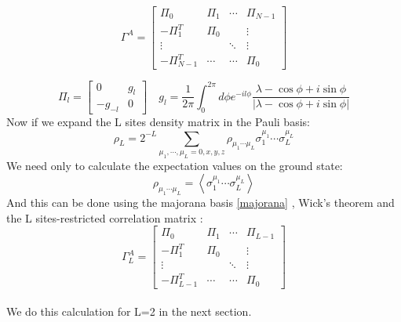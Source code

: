 \documentclass[10pt,a4paper]{article}
\begin{document}
	\begin{equation}\label{eq:corrmatr2}
	\Gamma^{A}=\left[\begin{array}{cccc}
	\Pi_{0} & \Pi_{1} & \cdots & \Pi_{N-1} \\
	-\Pi_{1}^T & \Pi_{0} & & \vdots \\
	\vdots & & \ddots & \vdots \\
	-\Pi_{N-1}^T & \cdots & \cdots & \Pi_{0}
	\end{array}\right]\end{equation}

	\begin{equation}\label{eq:corrmatr3}
	\Pi_{l}=\left[\begin{array}{cc}
	0 & g_{l} \\
	-g_{-l} & 0
	\end{array}\right] 
	 \quad g_{l}=\frac{1}{2 \pi} \int_{0}^{2 \pi} d \phi e^{-i l \phi} \frac{\lambda-\cos \phi+i \sin \phi}{|\lambda-\cos\phi +i  \sin \phi|}\end{equation}	 
	 \newline
Now if we expand the L sites density matrix in the Pauli basis:
\begin{equation}\label{eq:rhoexpansion}\rho_{L}=2^{-L} \sum_{\mu_{1}, \cdots, \mu_{L}=0, x, y, z} \rho_{\mu_{1} \cdots \mu_{L}} \sigma_{1}^{\mu_{1}} \cdots \sigma_{L}^{\mu_{L}}\end{equation}
We need only to calculate the expectation values on the ground state:
\begin{equation}\rho_{\mu_{1} \cdots \mu_{L}}=\left\langle\sigma_{1}^{\mu_{1}} \cdots \sigma_{L}^{\mu_{L}}\right\rangle\end{equation}
And this can be done using the majorana basis \ref{majorana} , Wick's theorem and the L sites-restricted correlation matrix :
\begin{equation}\label{eq:corrmatrrestrict}
\Gamma^{A}_L=\left[\begin{array}{cccc}
\Pi_{0} & \Pi_{1} & \cdots & \Pi_{L-1} \\
-\Pi_{1}^T & \Pi_{0} & & \vdots \\
\vdots & & \ddots & \vdots \\
-\Pi_{L-1}^T & \cdots & \cdots & \Pi_{0}
\end{array}\right]\end{equation}\\
We do this calculation for L=2 in the next section.

	
\end{document}

